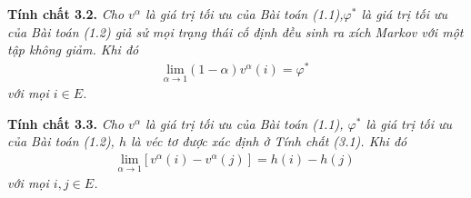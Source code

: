 \documentclass[12pt,a4paper]{report}
\begin{document}
    \begin{shaded*}
    	\noindent
    	\textbf{Tính chất 3.2. } \textit{Cho $v^\alpha$ là giá trị tối ưu của Bài toán (1.1),$\varphi^*$ là giá trị tối ưu của Bài toán (1.2)  giả sử mọi trạng thái cố định đều sinh ra xích Markov với một tập không giảm. Khi đó
    		\begin{align*}
    		\underset{\alpha \rightarrow 1}{\mathrm{lim}}(1-\alpha)v^\alpha(i)=\varphi^*
    		\end{align*}
    		với mọi $i \in E$.
    	} 
    \end{shaded*}   

\begin{shaded*}
	\noindent
	\textbf{Tính chất 3.3. } \textit{Cho $v^\alpha$ là giá trị tối ưu của Bài toán (1.1), $\varphi^*$ là giá trị tối ưu của Bài toán (1.2), $h$ là véc tơ được xác định ở Tính chất (3.1). Khi đó
		\begin{align*}
		\underset{\alpha \rightarrow 1}{\mathrm{lim}}[v^\alpha (i)-v^\alpha (j)]=h(i)-h(j)
		\end{align*}
		với mọi $i,j \in E$.
	} 
\end{shaded*} 
\end{document}
